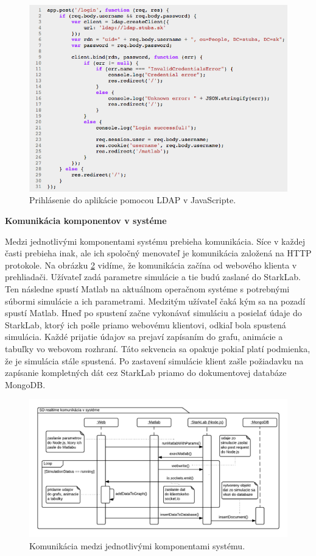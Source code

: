 \begin{figure}[H]
  \centering
  \includegraphics[scale=0.7]{img/code/ldap-login.png}
  \caption{Prihlásenie do aplikácie pomocou LDAP v JavaScripte.}
  \label{img-sequence-ldap-login-js}
\end{figure}

\noindent \textbf{Komunikácia komponentov v systéme}

Medzi jednotlivými komponentami systému prebieha komunikácia. Síce v každej časti prebieha inak, ale ich spoločný menovateľ je komunikácia založená na HTTP protokole. Na obrázku \ref{img-sequence-realtime} vidíme, že komunikácia začína od webového klienta v prehliadači. Užívateľ zadá parametre simulácie a tie budú zaslané do StarkLab. Ten následne spustí Matlab na aktuálnom operačnom systéme s potrebnými súbormi simulácie a ich parametrami. Medzitým užívateľ čaká kým sa na pozadí spustí Matlab. Hneď po spustení začne vykonávať simuláciu a posielať údaje do StarkLab, ktorý ich pošle priamo webovému klientovi, odkiaľ bola spustená simulácia. Každé prijatie údajov sa prejaví zapísaním do grafu, animácie a tabuľky vo webovom rozhraní. Táto sekvencia sa opakuje pokiaľ platí podmienka, že je simulácia stále spustená. Po zastavení simulácie klient zašle požiadavku na zapísanie kompletných dát cez StarkLab priamo do dokumentovej databáze MongoDB.

\begin{figure}[H]
  \centering
  \includegraphics[scale=0.38]{img/diagrams/sequence-realtime-communication.png}
  \caption{Komunikácia medzi jednotlivými komponentami systému.}
  \label{img-sequence-realtime}
\end{figure}

